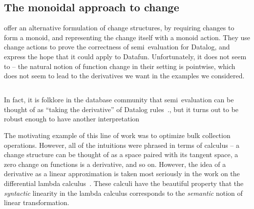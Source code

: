 


\subsection{The monoidal approach to change}

 offer an alternative
formulation of change structures, by requiring changes to form a
monoid, and representing the change itself with a monoid action. They
use change actions to prove the correctness of semi\naive\ evaluation
for Datalog, and express the hope that it could apply to Datafun.
Unfortunately, it does not seem to -- the natural notion of function
change in their setting is pointwise, which does not seem to lead to
the derivatives we want in the examples we considered.


\subsection{}

In fact, it is folklore in the database community that semi\naive\ evaluation
can be thought of as ``taking the derivative'' of Datalog rules~., but it turns out to be robust enough to have another interpretation 

%
The motivating example of this line of work was to optimize bulk collection
operations. However, all of the intuitions were phrased in terms of calculus --
a change structure can be thought of as a space paired with its tangent space, a
zero change on functions is a derivative, and so on. However, the idea of a
derivative as a linear approximation is taken most seriously in the work on the
differential lambda calculus~\citep{dlc}. These calculi have the beautiful
property that the \emph{syntactic} linearity in the lambda calculus corresponds
to the \emph{semantic} notion of linear transformation.

